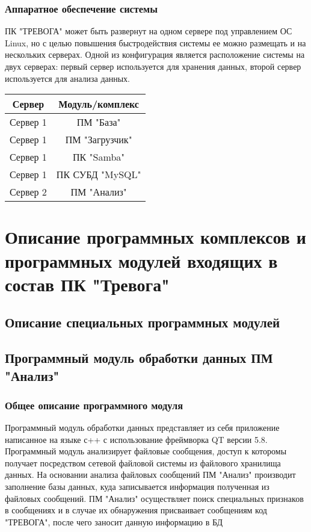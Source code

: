 \documentclass[12pt]{article}[a4paper,14pt,russian]
\begin{document}
	\subsubsection{Аппаратное обеспечение системы}
	ПК "ТРЕВОГА" может быть развернут на одном сервере под управлением ОС Linux, но с целью повышения быстродействия системы ее можно размещать и на нескольких серверах. Одной из конфигурация является расположение системы на двух серверах:
	первый сервер используется для хранения данных, второй сервер используется для анализа данных. 
	\begin{tabular}{|c|c|}
		\hline
		Сервер & Модуль/комплекс  \\
		\hline
		Сервер 1 & ПМ "База" \\
		Сервер 1 & ПМ "Загрузчик" \\
		Сервер 1 & ПК "Samba" \\
		Сервер 1 & ПК СУБД "MySQL" \\
		Сервер 2 & ПМ "Анализ" \\
		
	\end{tabular}
	\section{Описание программных комплексов и программных модулей входящих в состав ПК "Тревога"}
	\subsection{Описание специальных программных модулей}
	\subsection{Программный модуль обработки данных ПМ "Анализ"}
	\subsubsection{Общее описание программного модуля}
	Программный модуль обработки данных представляет из себя приложение написанное на
	языке с++ с использование фреймворка QT версии 5.8. Программный модуль анализирует файловые сообщения, доступ к которомы получает посредством сетевой файловой системы из файлового хранилища данных. На основании анализа файловых сообщений ПМ "Анализ" производит заполнение базы данных, куда записывается информация полученная из файловых сообщений. ПМ "Анализ" осуществляет поиск специальных признаков в сообщениях и в случае их обнаружения присваивает сообщениям код "ТРЕВОГА", после чего заносит данную информацию в БД
	
\end{document}
